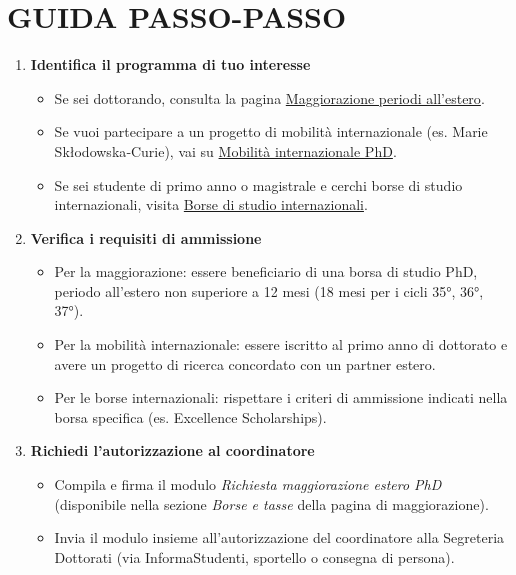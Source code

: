 \documentclass{article}
\begin{document}
\section{GUIDA PASSO-PASSO}
\begin{enumerate}[label=\arabic*.]
    \item \textbf{Identifica il programma di tuo interesse}
    \begin{itemize}
        \item Se sei dottorando, consulta la pagina \href{https://www.unimi.it/it/studiare/frequentare-un-corso-post-laurea/dottorati-di-ricerca-phd/borse-e-tasse/maggiorazione-periodi-allestero}{Maggiorazione periodi all’estero}.
        \item Se vuoi partecipare a un progetto di mobilità internazionale (es. Marie Skłodowska‑Curie), vai su \href{https://www.unimi.it/it/studiare/frequentare-un-corso-post-laurea/dottorati-di-ricerca-phd/mobilita-internazionale-phd}{Mobilità internazionale PhD}.
        \item Se sei studente di primo anno o magistrale e cerchi borse di studio internazionali, visita \href{https://www.unimi.it/it/studiare/borse-premi-mense-e-alloggi/borse-di-studio-internazionali}{Borse di studio internazionali}.
    \end{itemize}
    \item \textbf{Verifica i requisiti di ammissione}
    \begin{itemize}
        \item Per la maggiorazione: essere beneficiario di una borsa di studio PhD, periodo all’estero non superiore a 12 mesi (18 mesi per i cicli 35°, 36°, 37°).
        \item Per la mobilità internazionale: essere iscritto al primo anno di dottorato e avere un progetto di ricerca concordato con un partner estero.
        \item Per le borse internazionali: rispettare i criteri di ammissione indicati nella borsa specifica (es. Excellence Scholarships).
    \end{itemize}
    \item \textbf{Richiedi l’autorizzazione al coordinatore}
    \begin{itemize}
        \item Compila e firma il modulo \textit{Richiesta maggiorazione estero PhD} (disponibile nella sezione \textit{Borse e tasse} della pagina di maggiorazione).
        \item Invia il modulo insieme all’autorizzazione del coordinatore alla Segreteria Dottorati (via InformaStudenti, sportello o consegna di persona).

\end{itemize}
\end{enumerate}
\end{document}
